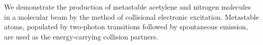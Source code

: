 We demonstrate the production of metastable acetylene and nitrogen
molecules in a molecular beam by the method of collisional electronic
excitation.  Metastable atoms, populated by two-photon transitions
followed by spontaneous emission, are used as the energy-carrying
collision partners.


%  
% 
% 